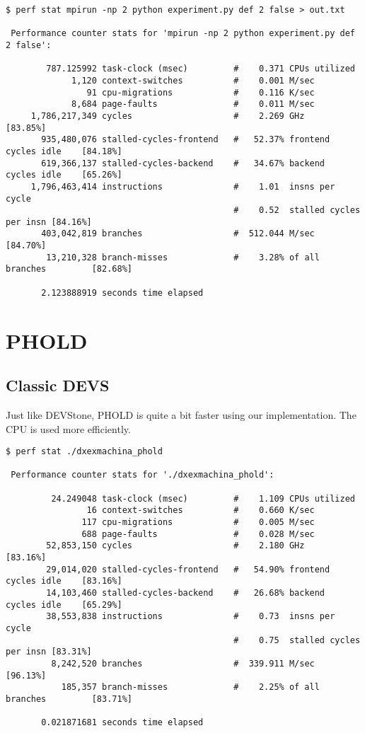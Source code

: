 \documentclass[10pt,a4paper]{report}
\begin{document}
\begin{Verbatim}[fontsize=\small]
$ perf stat mpirun -np 2 python experiment.py def 2 false > out.txt

 Performance counter stats for 'mpirun -np 2 python experiment.py def 2 false':

        787.125992 task-clock (msec)         #    0.371 CPUs utilized          
             1,120 context-switches          #    0.001 M/sec                  
                91 cpu-migrations            #    0.116 K/sec                  
             8,684 page-faults               #    0.011 M/sec                  
     1,786,217,349 cycles                    #    2.269 GHz                     [83.85%]
       935,480,076 stalled-cycles-frontend   #   52.37% frontend cycles idle    [84.18%]
       619,366,137 stalled-cycles-backend    #   34.67% backend  cycles idle    [65.26%]
     1,796,463,414 instructions              #    1.01  insns per cycle        
                                             #    0.52  stalled cycles per insn [84.16%]
       403,042,819 branches                  #  512.044 M/sec                   [84.70%]
        13,210,328 branch-misses             #    3.28% of all branches         [82.68%]

       2.123888919 seconds time elapsed
\end{Verbatim}

\chapter*{PHOLD}
\section{Classic DEVS}
Just like DEVStone, PHOLD is quite a bit faster using our implementation. The CPU is used more efficiently.
\begin{Verbatim}[fontsize=\small]
$ perf stat ./dxexmachina_phold 

 Performance counter stats for './dxexmachina_phold':

         24.249048 task-clock (msec)         #    1.109 CPUs utilized          
                16 context-switches          #    0.660 K/sec                  
               117 cpu-migrations            #    0.005 M/sec                  
               688 page-faults               #    0.028 M/sec                  
        52,853,150 cycles                    #    2.180 GHz                     [83.16%]
        29,014,020 stalled-cycles-frontend   #   54.90% frontend cycles idle    [83.16%]
        14,103,460 stalled-cycles-backend    #   26.68% backend  cycles idle    [65.29%]
        38,553,838 instructions              #    0.73  insns per cycle        
                                             #    0.75  stalled cycles per insn [83.31%]
         8,242,520 branches                  #  339.911 M/sec                   [96.13%]
           185,357 branch-misses             #    2.25% of all branches         [83.71%]

       0.021871681 seconds time elapsed
\end{Verbatim}
\end{document}
